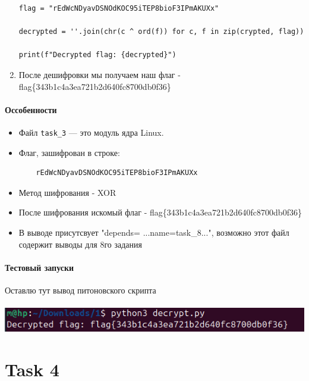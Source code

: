 \begin{enumerate}
\begin{verbatim}
flag = "rEdWcNDyavDSNOdKOC95iTEP8bioF3IPmAKUXx"

decrypted = ''.join(chr(c ^ ord(f)) for c, f in zip(crypted, flag))

print(f"Decrypted flag: {decrypted}")

        \end{verbatim}
        \item После дешифровки мы получаем наш флаг - flag\{343b1c4a3ea721b2d640fc8700db0f36\}
    \end{enumerate}

    \vspace{0.5cm}

    \noindent

    \paragraph{Оссобенности}
    \begin{itemize}
        \item Файл \texttt{task\_3} — это модуль ядра Linux.
        \item Флаг, зашифрован в строке:
        \begin{verbatim}
    rEdWcNDyavDSNOdKOC95iTEP8bioF3IPmAKUXx
        \end{verbatim}
        \item Метод шифрования - XOR
        \item После шифрования искомый флаг - flag\{343b1c4a3ea721b2d640fc8700db0f36\}
        \item В выводе присутсвует "depends= ...name=task\_8...", возможно этот файл содержит выводы для 8го задания
    \end{itemize}

    \paragraph{Тестовый запуски}
    Оставлю тут вывод питоновского скрипта

    \paragraph{}
    \includegraphics[width=1\linewidth]{static/solution_task_3.png}


    \section*{Task 4}



